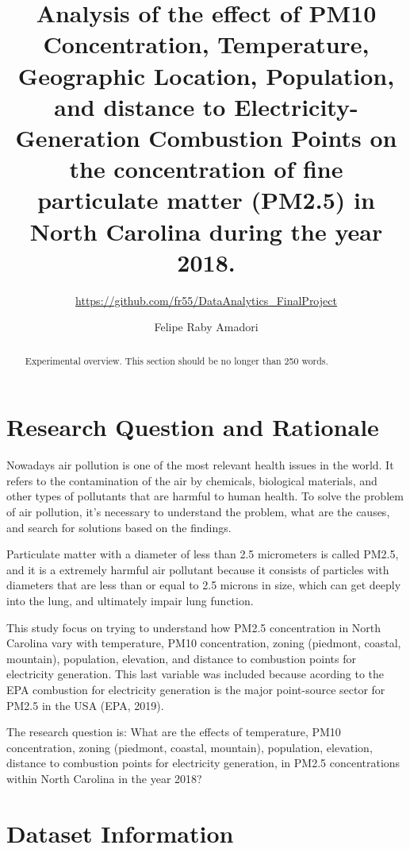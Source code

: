 \documentclass[12pt,]{article}
\title{Analysis of the effect of PM10 Concentration, Temperature, Geographic
Location, Population, and distance to Electricity-Generation Combustion
Points on the concentration of fine particulate matter (PM2.5) in North
Carolina during the year 2018.}
\subtitle{\url{https://github.com/fr55/DataAnalytics_FinalProject}}
\author{Felipe Raby Amadori}
\date{}
\begin{document}
\maketitle
\begin{abstract}
Experimental overview. This section should be no longer than 250 words.
\end{abstract}

\newpage

\tableofcontents  \newpage
\listoftables  \newpage
\listoffigures  \newpage

\section{Research Question and
Rationale}\label{research-question-and-rationale}

Nowadays air pollution is one of the most relevant health issues in the
world. It refers to the contamination of the air by chemicals,
biological materials, and other types of pollutants that are harmful to
human health. To solve the problem of air pollution, it's necessary to
understand the problem, what are the causes, and search for solutions
based on the findings.

Particulate matter with a diameter of less than 2.5 micrometers is
called PM2.5, and it is a extremely harmful air pollutant because it
consists of particles with diameters that are less than or equal to 2.5
microns in size, which can get deeply into the lung, and ultimately
impair lung function.

This study focus on trying to understand how PM2.5 concentration in
North Carolina vary with temperature, PM10 concentration, zoning
(piedmont, coastal, mountain), population, elevation, and distance to
combustion points for electricity generation. This last variable was
included because acording to the EPA combustion for electricity
generation is the major point-source sector for PM2.5 in the USA (EPA,
2019).

The research question is: What are the effects of temperature, PM10
concentration, zoning (piedmont, coastal, mountain), population,
elevation, distance to combustion points for electricity generation, in
PM2.5 concentrations within North Carolina in the year 2018?

\newpage

\section{Dataset Information}\label{dataset-information}
\end{document}
